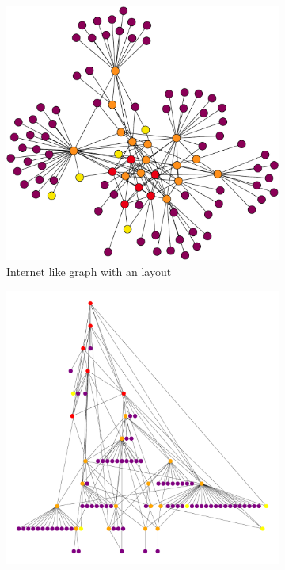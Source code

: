 \begin{figure}[ht]
     \centering
     \begin{subfigure}[b]{0.37\textwidth}
         \centering
         \includegraphics[width=\textwidth]{images/internet_graph/graph-100-colored.pdf}
		 \caption{Internet like graph with an  layout}
         \label{fig:internet_graph_explosive}
     \end{subfigure}
     \hfill
     \begin{subfigure}[b]{0.37\textwidth}
         \centering
         \includegraphics[width=\textwidth]{images/internet_graph/graph_dot.pdf}

\end{subfigure}
\end{figure}
